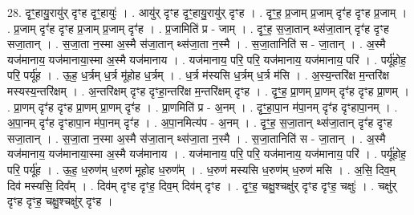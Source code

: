 \documentclass[17pt]{extarticle}
\begin{document}
28. दृꣳ॒॒हायु॒रायु॑र् दृꣳह दृꣳ॒॒हायुः॑ । . आयु॑र् दृꣳह दृꣳ॒॒हायु॒रायु॑र् दृꣳह । . दृꣳ॒॒ह॒ प्र॒जाम् प्र॒जाम् दृꣳ॑ह दृꣳह प्र॒जाम् । . प्र॒जाम् दृꣳ॑ह दृꣳह प्र॒जाम् प्र॒जाम् दृꣳ॑ह । . प्र॒जामिति॑ प्र - जाम् । . दृꣳ॒॒ह॒ स॒जा॒तान् थ्स॑जा॒तान् दृꣳ॑ह दृꣳह सजा॒तान् । . स॒जा॒ता न॒स्मा अ॒स्मै स॑जा॒तान् थ्स॑जा॒ता न॒स्मै । . स॒जा॒तानिति॑ स - जा॒तान् । . अ॒स्मै यज॑मानाय॒ यज॑मानाया॒स्मा अ॒स्मै यज॑मानाय । . यज॑मानाय॒ परि॒ परि॒ यज॑मानाय॒ यज॑मानाय॒ परि॑ । . पर्यू॑होह॒ परि॒ पर्यू॑ह । . ऊ॒ह॒ ध॒र्त्रम् ध॒र्त्र मू॑होह ध॒र्त्रम् । . ध॒र्त्र म॑स्यसि ध॒र्त्रम् ध॒र्त्र म॑सि । . अ॒स्य॒न्तरि॑क्ष म॒न्तरि॑क्ष मस्यस्य॒न्तरि॑क्षम् । . अ॒न्तरि॑क्षम् दृꣳह दृꣳहा॒न्तरि॑क्ष म॒न्तरि॑क्षम् दृꣳह । . दृꣳ॒॒ह॒ प्रा॒णम् प्रा॒णम् दृꣳ॑ह दृꣳह प्रा॒णम् । . प्रा॒णम् दृꣳ॑ह दृꣳह प्रा॒णम् प्रा॒णम् दृꣳ॑ह । . प्रा॒णमिति॑ प्र - अ॒नम् । . दृꣳ॒॒हा॒पा॒न म॑पा॒नम् दृꣳ॑ह दृꣳहापा॒नम् । . अ॒पा॒नम् दृꣳ॑ह दृꣳहापा॒न म॑पा॒नम् दृꣳ॑ह । . अ॒पा॒नमित्य॑प - अ॒नम् । . दृꣳ॒॒ह॒ स॒जा॒तान् थ्स॑जा॒तान् दृꣳ॑ह दृꣳह सजा॒तान् । . स॒जा॒ता न॒स्मा अ॒स्मै स॑जा॒तान् थ्स॑जा॒ता न॒स्मै । . स॒जा॒तानिति॑ स - जा॒तान् । . अ॒स्मै यज॑मानाय॒ यज॑मानाया॒स्मा अ॒स्मै यज॑मानाय । . यज॑मानाय॒ परि॒ परि॒ यज॑मानाय॒ यज॑मानाय॒ परि॑ । . पर्यू॑होह॒ परि॒ पर्यू॑ह । . ऊ॒ह॒ ध॒रुण॑म् ध॒रुण॑ मूहोह ध॒रुण᳚म् । . ध॒रुण॑ मस्यसि ध॒रुण॑म् ध॒रुण॑ मसि । . अ॒सि॒ दिव॒म् दिव॑ मस्यसि॒ दिव᳚म् । . दिव॑म् दृꣳह दृꣳह॒ दिव॒म् दिव॑म् दृꣳह । . दृꣳ॒॒ह॒ चक्षु॒श्चक्षु॑र् दृꣳह दृꣳह॒ चक्षुः॑ । . चक्षु॑र् दृꣳह दृꣳह॒ चक्षु॒श्चक्षु॑र् दृꣳह । \newline
\end{document}
